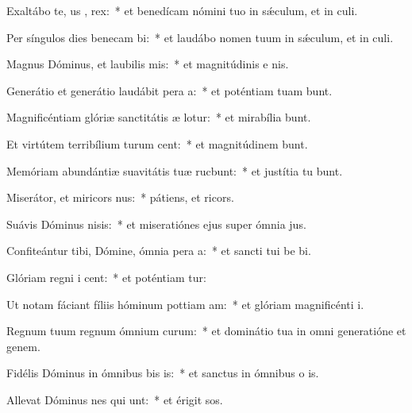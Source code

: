 \item Exaltábo te, us , rex:~* et benedícam nómini tuo in sǽculum, et in  culi.
\item Per síngulos dies benecam bi:~* et laudábo nomen tuum in sǽculum, et in  culi.
\item Magnus Dóminus, et laubilis mis:~* et magnitúdinis e   nis.
\item Generátio et generátio laudábit pera a:~* et poténtiam tuam bunt.
\item Magnificéntiam glóriæ sanctitátis æ lotur:~* et mirabília  bunt.
\item Et virtútem terribílium turum cent:~* et magnitúdinem  bunt.
\item Memóriam abundántiæ suavitátis tuæ rucbunt:~* et justítia tu bunt.
\item Miserátor, et miricors nus:~* pátiens, et  ricors.
\item Suávis Dóminus nisis:~* et miseratiónes ejus super ómnia  jus.
\item Confiteántur tibi, Dómine, ómnia pera a:~* et sancti tui be bi.
\item Glóriam regni i cent:~* et poténtiam  tur:
\item Ut notam fáciant fíliis hóminum pottiam am:~* et glóriam magnificénti  i.
\item Regnum tuum regnum ómnium curum:~* et dominátio tua in omni generatióne et genem.
\item Fidélis Dóminus in ómnibus bis is:~* et sanctus in ómnibus o is.
\item Allevat Dóminus nes qui unt:~* et érigit  sos.
